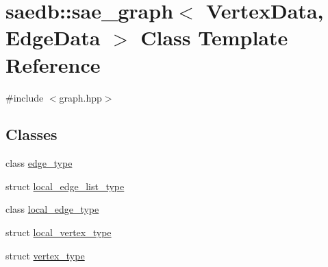 \hypertarget{classsaedb_1_1sae__graph}{\section{saedb\-:\-:sae\-\_\-graph$<$ Vertex\-Data, Edge\-Data $>$ Class Template Reference}
\label{d6/d2b/classsaedb_1_1sae__graph}
}


{\ttfamily \#include $<$graph.\-hpp$>$}

\subsection*{Classes}
\begin{DoxyCompactItemize}
\item 
class \hyperlink{classsaedb_1_1sae__graph_1_1edge__type}{edge\-\_\-type}
\item 
struct \hyperlink{structsaedb_1_1sae__graph_1_1local__edge__list__type}{local\-\_\-edge\-\_\-list\-\_\-type}
\item 
class \hyperlink{classsaedb_1_1sae__graph_1_1local__edge__type}{local\-\_\-edge\-\_\-type}
\item 
struct \hyperlink{structsaedb_1_1sae__graph_1_1local__vertex__type}{local\-\_\-vertex\-\_\-type}
\item 
struct \hyperlink{structsaedb_1_1sae__graph_1_1vertex__type}{vertex\-\_\-type}
\end{DoxyCompactItemize}
